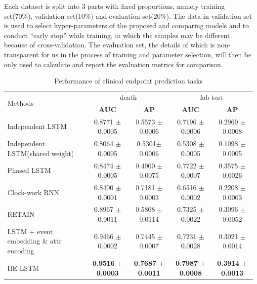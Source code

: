 \documentclass[letterpaper]{article} %
\begin{document}
Each dataset is split into 3 parts with fixed proportions, namely training set(70\%), validation set(10\%) and evaluation set(20\%). The data in validation set is used to select hyper-parameters of the proposed and comparing models and to conduct ``early stop'' while training, in which the samples may be different because of cross-validation.
The evaluation set, the details of which is non-transparent for us in the process of training and parameter selection, will then be only used to calculate and report the evaluation metrics for comparison.

\begin{table}[!t]
\renewcommand\arraystretch{0.9}
\centering

\begin{tabular}{|l||c|c||c|c|}
\hline
\multirow{2}{*}{Methods} & \multicolumn{2}{c||}{death} & \multicolumn{2}{c|}{lab test}  \\
\cline{2-5}
& \textbf{AUC }
&  \textbf{AP}
&\textbf{AUC }
& \textbf{AP }  \\\hline


Independent LSTM      & 0.8771  $\pm$ 0.0005      & 0.5573 $\pm$ 0.0006 & 0.7196 $\pm$ 0.0006& 0.2969 $\pm$ 0.0008 \\
Independent LSTM(shared weight)   & 0.8064  $\pm$ 0.0005       & 0.5301$\pm$ 0.0006 & 0.5308 $\pm$ 0.0005 & 0.1098  $\pm$ 0.0005 \\
\hline
Phased LSTM & 0.8474 $\pm$ 0.0005  & 0.4900 $\pm$ 0.0075& 0.7722 $\pm$ 0.0007& 0.3575 $\pm$ 0.0026 \\
Clock-work RNN       & 0.8400 $\pm$ 0.0001     &  0.7181 $\pm$ 0.0003 & 0.6516 $\pm$ 0.0002 & 0.2208  $\pm$ 0.0003\\


\hline

RETAIN & 0.8967 $\pm$ 0.0011 & 0.5808 $\pm$ 0.0114 & 0.7325 $\pm$ 0.0022& 0.3096 $\pm$ 0.0052\\
LSTM + event embedding \& attr encoding& 0.9466 $\pm$ 0.0002 & 0.7445 $\pm$ 0.0007 & 0.7231 $\pm$ 0.0028& 0.3021 $\pm$ 0.0014\\
\hline

HE-LSTM & \textbf{0.9516  $\pm$ 0.0003}& \textbf{0.7687 $\pm$ 0.0011} & \textbf{0.7987 $\pm$ 0.0008} & \textbf{0.3914 $\pm$ 0.0013} \\


\hline
\end{tabular}

\caption{Performance of clinical endpoint prediction tasks}
\label{tab:result}

\end{table}
\end{document}
